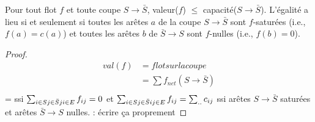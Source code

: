 \begin{mylem}
  Pour tout flot $f$ et toute coupe $S \to \bar{S}$, valeur($f$) $\leq$ capacité($S \to \bar{S}$). L’égalité a lieu si et seulement si toutes les arêtes $a$ de la coupe $S \to \bar{S}$ sont $f$-saturées (i.e., $f(a) = c(a)$) et toutes les arêtes $b$ de $\bar{S} \to S$ sont $f$-nulles (i.e., $f(b) = 0$).

  \begin{proof}
    \begin{align*}
      val(f) & = flot sur la coupe\\
             & = \sum f_{net}(S \to \bar{S})\\
    \end{align*}
    = ssi $\sum_{i \in S\\j \in \bar{S}\\ji \in E} f_{ij} = 0$ et $\sum_{i \in S\\j \in \bar{S}\\ij \in E} f_{ij} = \sum_{..} c_{ij}$
    ssi arêtes $S \to \bar{S}$ saturées et arêtes $\bar{S} \to S$ nulles.
    \addTODO : écrire ça proprement
  \end{proof}
\end{mylem}


